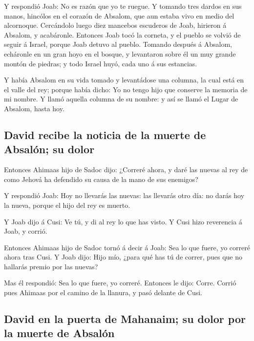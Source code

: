  Y respondió Joab: No es razón que yo te ruegue. Y
tomando tres dardos en sus manos, hincólos en el corazón de Absalom, que
aun estaba vivo en medio del alcornoque.  Cercándolo
luego diez mancebos escuderos de Joab, hirieron á Absalom, y acabáronle.
 Entonces Joab tocó la corneta, y el pueblo se volvió de
seguir á Israel, porque Joab detuvo al pueblo.  Tomando
después á Absalom, echáronle en un gran hoyo en el bosque, y levantaron
sobre él un muy grande montón de piedras; y todo Israel huyó, cada uno á
sus estancias.

 Y había Absalom en su vida tomado y levantádose una
columna, la cual está en el valle del rey; porque había dicho: Yo no
tengo hijo que conserve la memoria de mi nombre. Y llamó aquella columna
de su nombre: y así se llamó el Lugar de Absalom, hasta hoy.

\hypertarget{david-recibe-la-noticia-de-la-muerte-de-absaluxf3n-su-dolor}{%
\subsection{David recibe la noticia de la muerte de Absalón; su
dolor}\label{david-recibe-la-noticia-de-la-muerte-de-absaluxf3n-su-dolor}}

 Entonces Ahimaas hijo de Sadoc dijo: ¿Correré ahora, y
daré las nuevas al rey de como Jehová ha defendido su causa de la mano
de sus enemigos?

 Y respondió Joab: Hoy no llevarás las nuevas: las
llevarás otro día: no darás hoy la nueva, porque el hijo del rey es
muerto.

 Y Joab dijo á Cusi: Ve tú, y di al rey lo que has visto.
Y Cusi hizo reverencia á Joab, y corrió.

 Entonces Ahimaas hijo de Sadoc tornó á decir á Joab: Sea
lo que fuere, yo correré ahora tras Cusi. Y Joab dijo: Hijo mío, ¿para
qué has tú de correr, pues que no hallarás premio por las nuevas?

 Mas él respondió: Sea lo que fuere, yo correré. Entonces
le dijo: Corre. Corrió pues Ahimaas por el camino de la llanura, y pasó
delante de Cusi.

\hypertarget{david-en-la-puerta-de-mahanaim-su-dolor-por-la-muerte-de-absaluxf3n}{%
\subsection{David en la puerta de Mahanaim; su dolor por la muerte de
Absalón}\label{david-en-la-puerta-de-mahanaim-su-dolor-por-la-muerte-de-absaluxf3n}}

